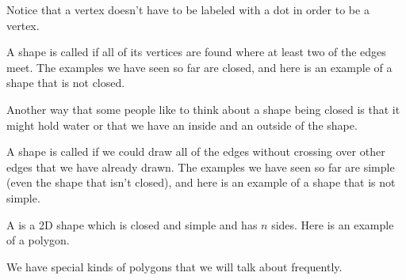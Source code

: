 \documentclass{ximera}
\begin{document}
Notice that a vertex doesn't have to be labeled with a dot in order to be a vertex.

\begin{definition}
	A shape is called  if all of its vertices are found where at least two of the edges meet. The examples we have seen so far are closed, and here is an example of a shape that is not closed.
	\begin{center}
	\end{center}
\end{definition}
Another way that some people like to think about a shape being closed is that it might hold water or that we have an inside and an outside of the shape.


\begin{definition}
	A shape is called  if we could draw all of the edges without crossing over other edges that we have already drawn. The examples we have seen so far are simple (even the shape that isn't closed), and here is an example of a shape that is not simple.
	\begin{center}
	\end{center}
\end{definition}



\begin{definition}
	A  is a 2D shape which is closed and simple and has $n$ sides. Here is an example of a polygon.
	\begin{center}
	\end{center}
\end{definition}

We have special kinds of polygons that we will talk about frequently.
\end{document}
